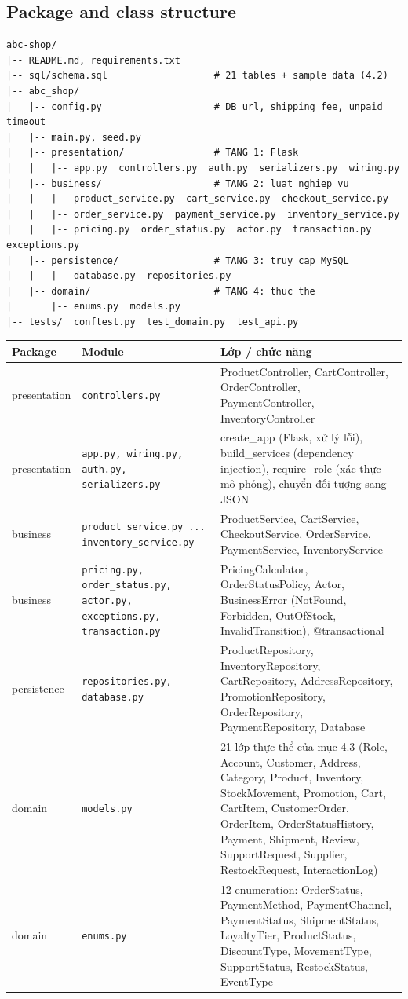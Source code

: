 \documentclass[12pt,a4paper,oneside]{report}
\begin{document}
\subsection{Package and class structure}
\begin{lstlisting}[language={},caption={Cấu trúc thư mục dự án},label={lst:tree}]
abc-shop/
|-- README.md, requirements.txt
|-- sql/schema.sql                   # 21 tables + sample data (4.2)
|-- abc_shop/
|   |-- config.py                    # DB url, shipping fee, unpaid timeout
|   |-- main.py, seed.py
|   |-- presentation/                # TANG 1: Flask
|   |   |-- app.py  controllers.py  auth.py  serializers.py  wiring.py
|   |-- business/                    # TANG 2: luat nghiep vu
|   |   |-- product_service.py  cart_service.py  checkout_service.py
|   |   |-- order_service.py  payment_service.py  inventory_service.py
|   |   |-- pricing.py  order_status.py  actor.py  transaction.py  exceptions.py
|   |-- persistence/                 # TANG 3: truy cap MySQL
|   |   |-- database.py  repositories.py
|   |-- domain/                      # TANG 4: thuc the
|       |-- enums.py  models.py
|-- tests/  conftest.py  test_domain.py  test_api.py
\end{lstlisting}

\begin{longtable}{@{}p{2.6cm}p{4.2cm}p{8.4cm}@{}}\toprule \textbf{Package} & \textbf{Module} & \textbf{Lớp / chức năng}\\\midrule\endhead
presentation & \texttt{controllers.py} & ProductController, CartController, OrderController, PaymentController, InventoryController\\\midrule
presentation & \texttt{app.py, wiring.py, auth.py, serializers.py} & create\_app (Flask, xử lý lỗi), build\_services (dependency injection), require\_role (xác thực mô phỏng), chuyển đối tượng sang JSON\\\midrule
business & \texttt{product\_service.py ... inventory\_service.py} & ProductService, CartService, CheckoutService, OrderService, PaymentService, InventoryService\\\midrule
business & \texttt{pricing.py, order\_status.py, actor.py, exceptions.py, transaction.py} & PricingCalculator, OrderStatusPolicy, Actor, BusinessError (NotFound, Forbidden, OutOfStock, InvalidTransition), @transactional\\\midrule
persistence & \texttt{repositories.py, database.py} & ProductRepository, InventoryRepository, CartRepository, AddressRepository, PromotionRepository, OrderRepository, PaymentRepository, Database\\\midrule
domain & \texttt{models.py} & 21 lớp thực thể của mục 4.3 (Role, Account, Customer, Address, Category, Product, Inventory, StockMovement, Promotion, Cart, CartItem, CustomerOrder, OrderItem, OrderStatusHistory, Payment, Shipment, Review, SupportRequest, Supplier, RestockRequest, InteractionLog)\\\midrule
domain & \texttt{enums.py} & 12 enumeration: OrderStatus, PaymentMethod, PaymentChannel, PaymentStatus, ShipmentStatus, LoyaltyTier, ProductStatus, DiscountType, MovementType, SupportStatus, RestockStatus, EventType\\\midrule
\bottomrule\end{longtable}
\end{document}
